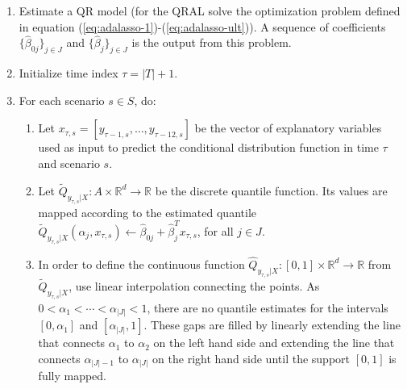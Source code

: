 \begin{enumerate}
	
	\item Estimate a QR model (for the QRAL solve the optimization problem defined in equation (\ref{eq:adalasso-1})-(\ref{eq:adalasso-ult})). 
	A sequence of coefficients $\{ \hat\beta_{0j} \}_{j \in J}$ and $\{ \hat\beta_{j} \}_{j \in J}$ is the output from this problem. 

	\item Initialize time index $\tau = |T| + 1$.
	
	\item For each scenario $s \in S$, do:
		\begin{enumerate}

		\item Let $x_{\tau,s} = [y_{\tau-1,s}, \dots, y_{\tau-12,s}]$ be the vector of explanatory variables used as input to predict the conditional distribution function in time $\tau$ and scenario $s$.

		\item Let $\tilde{Q}_{y_{\tau,s}|X}:A \times \mathbb{R}^d \rightarrow \mathbb{R}$ be the discrete quantile function. Its values are mapped according to the estimated quantile $\tilde Q_{y_{\tau,s}|X}(\alpha_j, x_{\tau,s}) \leftarrow \hat\beta_{0j} + \hat\beta_j^T x_{\tau,s}$, for all $j \in J$.
		
		\item In order to define the continuous function $\hat{Q}_{y_{\tau,s}|X}:[0,1] \times \mathbb{R}^d \rightarrow \mathbb{R}$ from $\tilde Q_{y_{\tau,s}|X}$, use linear interpolation connecting the points. As $0 < \alpha_1 < \cdots < \alpha_{|J|} < 1$, there are no quantile estimates for the intervals $[0,\alpha_1]$ and $[\alpha_{|J|},1]$. These gaps are filled by linearly extending the line that connects $\alpha_1$ to $\alpha_2$ on the left hand side and extending the line that connects $\alpha_{|J|-1}$ to $\alpha_{|J|}$ on the right hand side until the support $[0,1]$ is fully mapped.  

		
		

\end{enumerate}
\end{enumerate}
